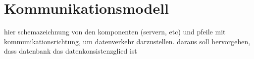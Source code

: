 		
%	
%		
%		
%		
%		
%
%	
%		
%
%			
%			
%		
%		
%		
	
        
    \section{Kommunikationsmodell}
	    
	    hier schemazeichnung von den komponenten (servern, etc) und pfeile mit kommunikationsrichtung, um datenverkehr darzustellen. daraus soll hervorgehen, dass datenbank das datenkonsistenzglied ist
	    